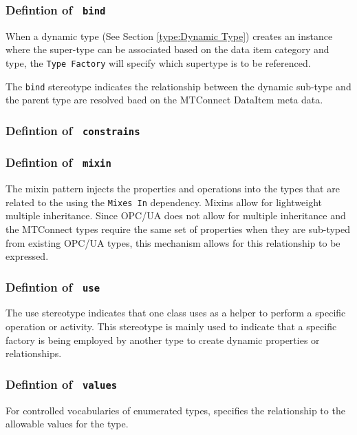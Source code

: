 \FloatBarrier



\FloatBarrier
\subsubsection{Defintion of \texttt{ bind}} \label{type:bind}

\FloatBarrier

When a dynamic type (See Section \ref{type:Dynamic Type}) creates an instance where the super-type
can be associated based on the data item category and type, the \texttt{Type Factory} will 
specify which supertype is to be referenced.

The \texttt{bind} stereotype indicates the relationship between the dynamic sub-type and the 
parent type are resolved baed on the MTConnect DataItem meta data.

\FloatBarrier
\subsubsection{Defintion of \texttt{ constrains}} \label{type:constrains}

\FloatBarrier



\FloatBarrier
\subsubsection{Defintion of \texttt{ mixin}} \label{type:mixin}

\FloatBarrier

The mixin pattern injects the properties and operations into the types 
that are related to the using the \texttt{Mixes In} dependency. Mixins allow for
lightweight multiple inheritance. Since OPC/UA does not allow for multiple inheritance 
and the MTConnect  types require the same set of properties when they are sub-typed
from existing OPC/UA types, this mechanism allows for this relationship to be expressed.


\FloatBarrier
\subsubsection{Defintion of \texttt{ use}} \label{type:use}

\FloatBarrier

The use stereotype indicates that one class uses as a helper to perform 
a specific operation or activity. This stereotype is mainly used to indicate
that a specific factory is being employed by another type to create dynamic
properties or relationships.

\FloatBarrier
\subsubsection{Defintion of \texttt{ values}} \label{type:values}

\FloatBarrier

For controlled vocabularies of enumerated types, specifies the relationship to the allowable 
values for the type.

\FloatBarrier
